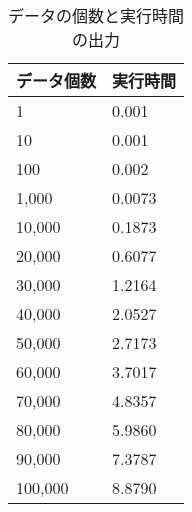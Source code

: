 \begin{table}[h]
    \centering
    \caption{データの個数と実行時間の出力}
    \label{tbl:データの個数と実行時間の出力}
    \begin{tabular}{ll}
        \multicolumn{1}{c}{データ個数} & \multicolumn{1}{c}{実行時間} \\
        \hline
        1                         & 0.001                    \\
        10                        & 0.001                    \\
        100                       & 0.002                    \\
        1,000                     & 0.0073                   \\
        10,000                    & 0.1873                   \\
        20,000                    & 0.6077                   \\
        30,000                    & 1.2164                   \\
        40,000                    & 2.0527                   \\
        50,000                    & 2.7173                   \\
        60,000                    & 3.7017                   \\
        70,000                    & 4.8357                   \\
        80,000                    & 5.9860                   \\
        90,000                    & 7.3787                   \\
        100,000                   & 8.8790                   \\
        \hline
    \end{tabular}
\end{table}